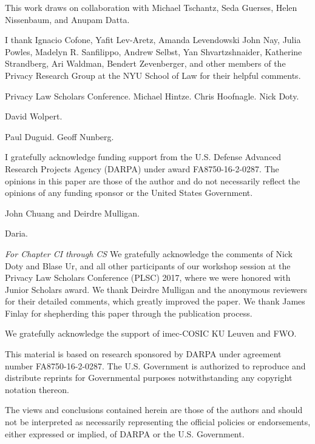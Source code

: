 \documentclass[../thesis.tex]{subfiles}
\begin{document}
This work draws on collaboration with Michael Tschantz, Seda Guerses,
Helen Nissenbaum, and Anupam Datta.

I thank Ignacio Cofone, Yafit Lev-Aretz, Amanda Levendowski
 John Nay, Julia Powles,
Madelyn R. Sanfilippo, Andrew Selbst, Yan Shvartzshnaider, Katherine
Strandberg, Ari Waldman, Bendert Zevenberger,  
and other members of the Privacy Research Group at
the NYU School of Law for their helpful comments.

Privacy Law Scholars Conference. Michael Hintze. Chris Hoofnagle.
Nick Doty.

David Wolpert.

Paul Duguid. Geoff Nunberg.

I gratefully acknowledge funding support 
from the U.S. Defense Advanced Research Projects Agency (DARPA) under
award FA8750-16-2-0287.
The opinions in this paper are those of the author and do not
necessarily reflect the opinions of any funding sponsor or the United
States Government.

John Chuang and Deirdre Mulligan.

Daria.


\emph{For Chapter CI through CS} We gratefully acknowledge the comments of Nick Doty and Blase Ur, and
all other participants of our workshop session at the Privacy Law
Scholars Conference (PLSC) 2017, where we were honored with Junior
Scholars award. We thank Deirdre Mulligan and the anonymous reviewers
for their detailed comments, which greatly improved the paper. We thank
James Finlay for shepherding this paper through the publication
process.

We gratefully acknowledge the support of imec-COSIC KU Leuven and FWO.


This material is based on research sponsored by DARPA under agreement
number FA8750-16-2-0287. The U.S. Government is authorized to reproduce
and distribute reprints for Governmental purposes notwithstanding any
copyright notation thereon.

The views and conclusions contained herein are those of the authors and
should not be interpreted as necessarily representing the official
policies or endorsements, either expressed or implied, of DARPA or the
U.S. Government.


 
\end{document}
